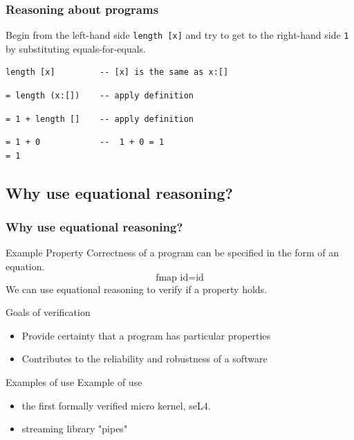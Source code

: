 \documentclass{beamer}
\begin{document}
\begin{frame}[fragile]
  \frametitle{Reasoning about programs}
Begin from the left-hand side \verb|length [x]| and try to get to the right-hand side \verb|1| by substituting equals-for-equals.
\begin{verbatim}
length [x]         -- [x] is the same as x:[]
\end{verbatim}
\pause
\begin{verbatim}
= length (x:[])    -- apply definition
\end{verbatim}
\pause
\begin{verbatim}
= 1 + length []    -- apply definition
\end{verbatim}
\pause
\begin{verbatim}
= 1 + 0            --  1 + 0 = 1
= 1
\end{verbatim}
\end{frame}

\subsection{Why use equational reasoning?}
\begin{frame}
\frametitle{Why use equational reasoning?}
\begin{block}{Example Property}
Correctness of a program can be specified in the form of an equation.
\begin{equation}
\text{fmap } \text{id}  =  \text{id}  
\end{equation}
We can use equational reasoning to verify if a property holds.  
\end{block}
\begin{block}{Goals of verification}
\begin{itemize}
\item Provide certainty that a program has particular properties
\item Contributes to the reliability and robustness of a software
\end{itemize}  
\end{block}
\begin{block}{Examples of use}
Example of use
\begin{itemize}
\item the first formally verified micro kernel, seL4.
\item streaming library "pipes"
\end{itemize}  
\end{block}
\end{frame}
\end{document}
